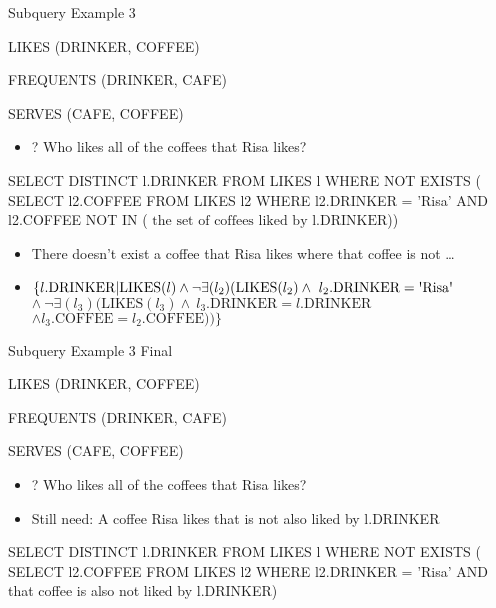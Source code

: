 \documentclass[aspectratio=169]{beamer}
\newenvironment{noindentitemize}
{ \begin{itemize}
 \setlength{\itemsep}{1.5ex}
  \setlength{\parsep}{0pt}   
  \setlength{\parskip}{0pt}
 \addtolength{\leftskip}{-2em}
 }
{ \end{itemize} }
\newcommand{\LIKES}{\textrm{LIKES}}
\newcommand{\COFFEE}{\textrm{COFFEE}}
\newcommand{\DRINKER}{\textrm{DRINKER}}
\begin{document}
\begin{frame}[fragile]{Subquery Example 3}

LIKES (DRINKER, COFFEE)

FREQUENTS (DRINKER, CAFE)

SERVES (CAFE, COFFEE)


\begin{noindentitemize}
\item[?] Who likes all of the coffees that Risa likes?
\end{noindentitemize}

\begin{SQL}
SELECT DISTINCT l.DRINKER
FROM LIKES l
WHERE NOT EXISTS (
  SELECT l2.COFFEE 
  FROM LIKES l2
  WHERE l2.DRINKER = 'Risa' AND l2.COFFEE NOT IN (
    $\textrm{the set of coffees liked by l.DRINKER}$))
\end{SQL}

\begin{noindentitemize}
\item There doesn't exist a coffee that Risa likes where that coffee is not \ldots
	\item[] $\{l.\DRINKER | \LIKES(l) \wedge \neg \exists(l_2)(\LIKES(l_2) \wedge\ 
	   l_2.\DRINKER = \textrm{\textquotesingle{Risa}\textquotesingle}$\\

           \hspace{2em}$\wedge\ \neg \exists(l_3)(\LIKES(l_3) \wedge\
		l_3.\DRINKER = l.\DRINKER $\\
	\hspace{2em}$\wedge l_3.\COFFEE = l_2.\COFFEE))\}$
\end{noindentitemize}



\end{frame}


\begin{frame}[fragile]{Subquery Example 3 Final}

LIKES (DRINKER, COFFEE)

FREQUENTS (DRINKER, CAFE)

SERVES (CAFE, COFFEE)


\begin{noindentitemize}
\item[?] Who likes all of the coffees that Risa likes?
\item Still need: A coffee Risa likes that is not also liked by l.DRINKER
\end{noindentitemize}

\begin{SQL}
SELECT DISTINCT l.DRINKER
FROM LIKES l
WHERE NOT EXISTS (
  SELECT l2.COFFEE 
  FROM LIKES l2
  WHERE l2.DRINKER = 'Risa' 
    AND that coffee is also not liked by l.DRINKER)
\end{SQL}
\end{frame}
\end{document}

